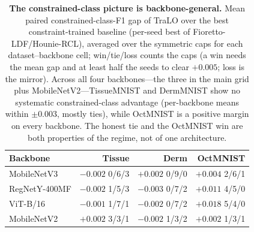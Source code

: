 \begin{table}[t]\centering\small
\setlength{\tabcolsep}{4.5pt}
\caption{\textbf{The constrained-class picture is backbone-general.} Mean paired
constrained-class-F1 gap of TraLO over the best constraint-trained baseline (per-seed best of
Fioretto-LDF/Hounie-RCL), averaged over the symmetric caps for each dataset--backbone cell;
{\scriptsize win/tie/loss} counts the caps (a win needs the mean gap and at least half the seeds
to clear $+0.005$; loss is the mirror). Across all four backbones---the three in the main grid
plus MobileNetV2---TissueMNIST and DermMNIST show no systematic constrained-class advantage
(per-backbone means within $\pm0.003$, mostly ties), while OctMNIST is a positive margin on every
backbone. The honest tie and the OctMNIST win are both properties of the regime, not of one architecture.}
\label{tab:bbgen}
\begin{tabular}{l rrr}
\toprule
Backbone & Tissue & Derm & OctMNIST \\
\midrule
MobileNetV3    & $-0.002$ {\scriptsize 0/6/3} & $+0.002$ {\scriptsize 0/9/0} & $+0.004$ {\scriptsize 2/6/1} \\
RegNetY-400MF  & $-0.002$ {\scriptsize 1/5/3} & $-0.003$ {\scriptsize 0/7/2} & $+0.011$ {\scriptsize 4/5/0} \\
ViT-B/16       & $-0.001$ {\scriptsize 1/7/1} & $-0.002$ {\scriptsize 0/7/2} & $+0.018$ {\scriptsize 5/4/0} \\
MobileNetV2    & $+0.002$ {\scriptsize 3/3/1} & $-0.002$ {\scriptsize 1/3/2} & $+0.002$ {\scriptsize 1/3/1} \\
\bottomrule
\end{tabular}
\end{table}
